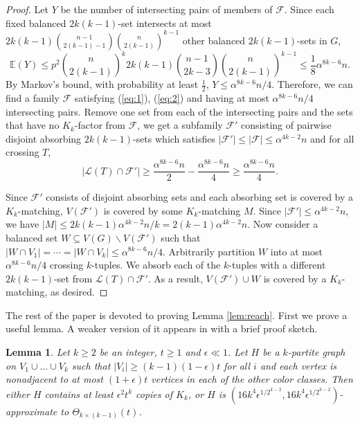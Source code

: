 \documentclass[reqno]{amsart}
\theoremstyle{plain}
\newtheorem{lemma}[theorem]{Lemma}
\def\a{\alpha}
\begin{document}
\begin{proof}
Let $Y$ be the number of intersecting pairs of members of $\mathcal{F}$. Since each fixed balanced $2k(k-1)$-set intersects at most $2k(k-1) \binom{n-1}{2(k-1)-1} \binom{n}{2(k-1)}^{k-1}$ other balanced $2k(k-1)$-sets in $G$,
\[
\mathbb{E}(Y)\le p^2\binom{n}{2(k-1)}^k 2k(k-1) \binom{n-1}{2k-3} \binom{n}{2(k-1)}^{k-1}\le \frac18\alpha^{8k-6}n.
\]
By Markov's bound, with probability at least $\frac{1}{2}$, $Y\le \alpha^{8k-6}n/4$.
Therefore, we can find a family $\mathcal{F}$ satisfying (\ref{eq:1}), (\ref{eq:2}) and having at most $\alpha^{8k-6}n/4$
intersecting pairs. Remove one set from each of the intersecting pairs and the sets that have no $K_k$-factor from $\mathcal{F}$, we get a subfamily $\mathcal{F}'$ consisting of pairwise disjoint absorbing $2k(k-1)$-sets which satisfies $|\mathcal{F}'|\le |\mathcal{F}|\le \alpha^{4k-2}n$ and for all crossing $T$,
\[
|\mathcal{L}(T)\cap\mathcal{F}'|\ge \frac{\alpha^{8k-6}n}2-\frac{\alpha^{8k-6}n}4\ge \frac{\alpha^{8k-6}n}4.
\]

Since $\mathcal{F}'$ consists of disjoint absorbing sets and each absorbing set is covered by a $K_k$-matching, $V(\mathcal{F}')$ is covered by some $K_k$-matching $M$. Since $|\mathcal{F}'|\le \alpha^{4k-2}n$, we have $|M|\le  2k(k-1)\alpha^{4k-2}n/k = 2(k-1)\a^{4k-2}n$.
Now consider a balanced set $W\subseteq V(G)\backslash V(\mathcal{F}')$ such that $|W\cap V_1|=\cdots=|W\cap V_k|\le \alpha^{8k-6}n/4$. Arbitrarily partition $W$ into at most $\alpha^{8k-6}n/4$ crossing $k$-tuples. We absorb each of the $k$-tuples with a different $2k(k-1)$-set from $\mathcal{L}(T)\cap\mathcal{F}'$. As a result, $V(\mathcal{F}')\cup W$ is covered by a $K_k$-matching, as desired.

\end{proof}














The rest of the paper is devoted to proving Lemma \ref{lem:reach}. First we prove a useful lemma. A weaker version of it appears in \cite[Proposition 1.4]{MaSz} with a brief proof sketch. %


\begin{lemma}
\label{lem3}
Let $k\ge 2$ be an integer, $t\ge 1$ and $\epsilon\ll 1$. Let $H$ be a $k$-partite graph on $V_1\cup \dots \cup V_k$ such that $|V_i| \ge (k-1)(1-\epsilon)t$ for all $i$ and each vertex is nonadjacent to at most $(1+\epsilon)t$ vertices in each of the other color classes. Then either $H$ contains at least $\epsilon^2 t^k $ copies of $K_k$, or $H$ is $(16 k^4 \epsilon^{1/{2^{k -2} }},16 k^4 \epsilon^{1/{2^{k-2} }})$-approximate to $\Theta_{k\times (k-1)}(t)$.
\end{lemma}
\end{document}
